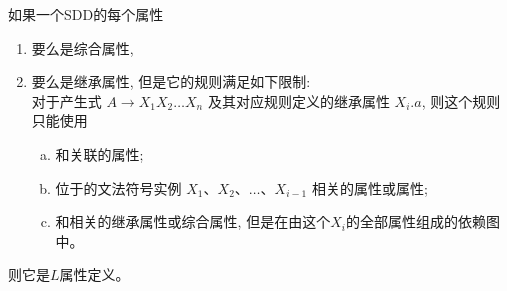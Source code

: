 





\begin{frame}{}
  \begin{center}
    \begin{definition}
      如果一个SDD的每个属性
      \begin{enumerate}[(1)]
        \setlength{\itemsep}{8pt}
        \item 要么是综合属性,
        \item 要么是继承属性, 但是它的规则满足如下限制: \\
          对于产生式 $A \to X_{1}X_{2} \dots X_{n}$ 及其对应规则定义的继承属性 $X_{i}.a$,
          则这个规则只能使用
          \begin{enumerate}[(a)]
            \setlength{\itemsep}{6pt}
            \item 和关联的属性;
            \item 位于的文法符号实例 $X_{1}$、$X_{2}$、$\dots$、$X_{i-1}$
              相关的属性或属性;
            \item 和相关的继承属性或综合属性,
              但是在由这个$X_{i}$的全部属性组成的依赖图中。
          \end{enumerate}
      \end{enumerate}
      则它是$L$属性定义。
    \end{definition}
  \end{center}
\end{frame}

